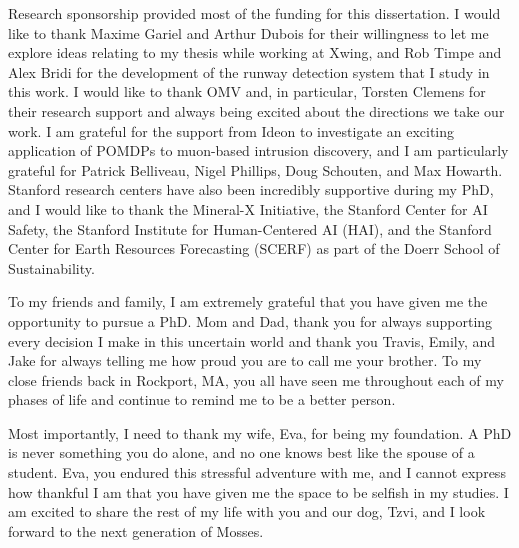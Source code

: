 Research sponsorship provided most of the funding for this dissertation.
I would like to thank Maxime Gariel and Arthur Dubois for their willingness to let me explore ideas relating to my thesis while working at Xwing, and Rob Timpe and Alex Bridi for the development of the runway detection system that I study in this work.
I would like to thank OMV and, in particular, Torsten Clemens for their research support and always being excited about the directions we take our work. 
I am grateful for the support from Ideon to investigate an exciting application of POMDPs to muon-based intrusion discovery, and I am particularly grateful for Patrick Belliveau, Nigel Phillips, Doug Schouten, and Max Howarth.
Stanford research centers have also been incredibly supportive during my PhD, and I would like to thank the Mineral-X Initiative, the Stanford Center for AI Safety, the Stanford Institute for Human-Centered AI (HAI), and the Stanford Center for Earth Resources Forecasting (SCERF) as part of the Doerr School of Sustainability.

To my friends and family, I am extremely grateful that you have given me the opportunity to pursue a PhD.
Mom and Dad, thank you for always supporting every decision I make in this uncertain world and thank you Travis, Emily, and Jake for always telling me how proud you are to call me your brother.
To my close friends back in Rockport, MA, you all have seen me throughout each of my phases of life and continue to remind me to be a better person.

Most importantly, I need to thank my wife, Eva, for being my foundation.
A PhD is never something you do alone, and no one knows best like the spouse of a student.
Eva, you endured this stressful adventure with me, and I cannot express how thankful I am that you have given me the space to be selfish in my studies.
I am excited to share the rest of my life with you and our dog, Tzvi, and I look forward to the next generation of Mosses.
